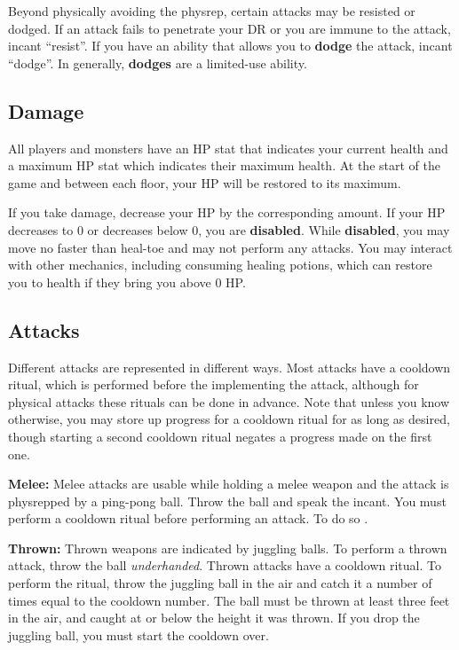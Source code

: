 \documentclass[green]{grimrock}
\begin{document}
Beyond physically avoiding the physrep, certain attacks may be resisted or dodged.  If an attack fails to penetrate your DR or you are immune to the attack, incant ``resist''.  If you have an ability that allows you to {\bf dodge} the attack, incant ``dodge''.  In generally, {\bf dodges} are a limited-use ability.

\subsection{Damage}  All players and monsters have an HP stat that indicates your current health and a maximum HP stat which indicates their maximum health.  At the start of the game and between each floor, your HP will be restored to its maximum.

If you take damage, decrease your HP by the corresponding amount.  If your HP decreases to 0 or decreases below 0, you are {\bf disabled}.  While {\bf disabled}, you may move no faster than heal-toe and may not perform any attacks.  You may interact with other mechanics, including consuming healing potions, which can restore you to health if they bring you above 0 HP.

\subsection{Attacks}
Different attacks are represented in different ways.  Most attacks have a cooldown ritual, which is performed before the implementing the attack, although for physical attacks these rituals can be done in advance. Note that unless you know otherwise, you may store up progress for a cooldown ritual for as long as desired, though starting a second cooldown ritual negates a progress made on the first one.

{\bf Melee:} Melee attacks are usable while holding a melee weapon and the attack is physrepped by a ping-pong ball.  Throw the ball and speak the incant.  You must perform a cooldown ritual before performing an attack.  To do so .

{\bf Thrown:}  Thrown weapons are indicated by juggling balls.  To perform a thrown attack, throw the ball \emph{underhanded}.  Thrown attacks have a cooldown ritual.  To perform the ritual, throw the juggling ball in the air and catch it a number of times equal to the cooldown number.  The ball must be thrown at least three feet in the air, and caught at or below the height it was thrown.  If you drop the juggling ball, you must start the cooldown over.
\end{document}
